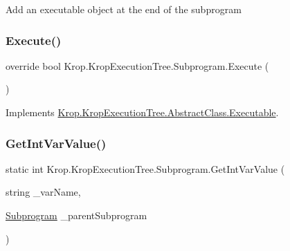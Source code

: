 Add an executable object at the end of the subprogram 

\mbox{\label{class_krop_1_1_krop_execution_tree_1_1_subprogram_ae33466ddf0761f860c5817a4263efd29}} 
\subsubsection{\texorpdfstring{Execute()}{Execute()}}
{\footnotesize\ttfamily override bool Krop.\+Krop\+Execution\+Tree.\+Subprogram.\+Execute (\begin{DoxyParamCaption}{ }\end{DoxyParamCaption})\hspace{0.3cm}{\ttfamily [virtual]}}



Implements \mbox{\hyperlink{class_krop_1_1_krop_execution_tree_1_1_abstract_class_1_1_executable_ac32692ce44b5f938a90111ee27e7b684}{Krop.\+Krop\+Execution\+Tree.\+Abstract\+Class.\+Executable}}.

\mbox{\label{class_krop_1_1_krop_execution_tree_1_1_subprogram_a3f33742aea9a7150f0dda2a17e84cf08}} 
\subsubsection{\texorpdfstring{Get\+Int\+Var\+Value()}{GetIntVarValue()}}
{\footnotesize\ttfamily static int Krop.\+Krop\+Execution\+Tree.\+Subprogram.\+Get\+Int\+Var\+Value (\begin{DoxyParamCaption}\item[{string}]{\+\_\+var\+Name,  }\item[{\mbox{\hyperlink{class_krop_1_1_krop_execution_tree_1_1_subprogram}{Subprogram}}}]{\+\_\+parent\+Subprogram }\end{DoxyParamCaption})\hspace{0.3cm}{\ttfamily [static]}}



